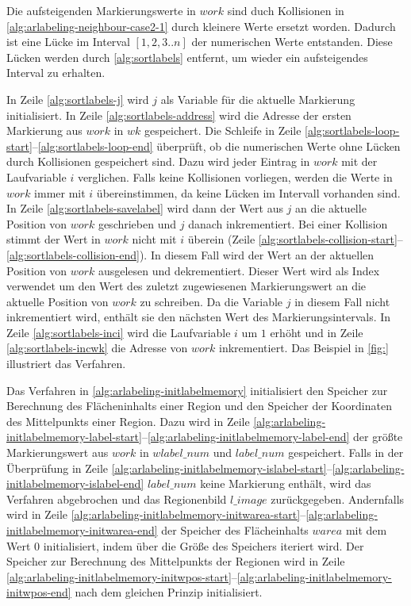 Die aufsteigenden Markierungswerte in $\mathit{work}$ sind duch Kollisionen in
 \autoref{alg:arlabeling-neighbour-case2-1} durch kleinere Werte ersetzt worden. Dadurch ist eine Lücke im Interval
 $\left[1,2,3..n\right]$ der numerischen Werte entstanden. Diese Lücken werden durch \autoref{alg:sortlabels}
 entfernt, um wieder ein aufsteigendes Interval zu erhalten.



In Zeile \ref{alg:sortlabels-j} wird $j$ als Variable für die aktuelle Markierung initialisiert. In Zeile
 \ref{alg:sortlabels-address} wird die Adresse der ersten Markierung aus $\mathit{work}$ in $\mathit{wk}$ gespeichert.
 Die Schleife in Zeile \ref{alg:sortlabels-loop-start}--\ref{alg:sortlabels-loop-end} überprüft, ob die numerischen
 Werte ohne Lücken durch Kollisionen gespeichert sind. Dazu wird jeder Eintrag in $\mathit{work}$ mit der Laufvariable
 $i$ verglichen. Falls keine Kollisionen vorliegen, werden die Werte in $\mathit{work}$ immer mit $i$ übereinstimmen,
 da keine Lücken im Intervall vorhanden sind. In Zeile \ref{alg:sortlabels-savelabel} wird dann der Wert aus $j$ an die
 aktuelle Position von $\mathit{work}$ geschrieben und $j$ danach inkrementiert. Bei einer Kollision stimmt der Wert in
 $\mathit{work}$ nicht mit $i$ überein
 (Zeile \ref{alg:sortlabels-collision-start}--\ref{alg:sortlabels-collision-end}). In diesem Fall wird der Wert an der
 aktuellen Position von $\mathit{work}$ ausgelesen und dekrementiert. Dieser Wert wird als Index verwendet um den Wert
 des zuletzt zugewiesenen Markierungswert an die aktuelle Position von $\mathit{work}$ zu schreiben. Da die Variable
 $j$ in diesem Fall nicht inkrementiert wird, enthält sie den nächsten Wert des Markierungsintervals. In Zeile
 \ref{alg:sortlabels-inci} wird die Laufvariable $i$ um $1$ erhöht und in Zeile \ref{alg:sortlabels-incwk} die Adresse
 von $\mathit{work}$ inkrementiert. Das Beispiel in \autoref{fig:} illustriert das Verfahren.

Das Verfahren in \autoref{alg:arlabeling-initlabelmemory} initialisiert den Speicher zur Berechnung des Flächeninhalts
 einer Region und den Speicher der Koordinaten des Mittelpunkts einer Region. Dazu wird in Zeile
 \ref{alg:arlabeling-initlabelmemory-label-start}--\ref{alg:arlabeling-initlabelmemory-label-end} der größte
 Markierungswert aus $\mathit{work}$ in $\mathit{wlabel\_num}$ und $\mathit{label\_num}$ gespeichert. Falls in der
 Überprüfung in Zeile
 \ref{alg:arlabeling-initlabelmemory-islabel-start}--\ref{alg:arlabeling-initlabelmemory-islabel-end}
 $\mathit{label\_num}$ keine Markierung enthält, wird das Verfahren abgebrochen und das Regionenbild $\mathit{l\_image}$
 zurückgegeben. Andernfalls wird in Zeile
 \ref{alg:arlabeling-initlabelmemory-initwarea-start}--\ref{alg:arlabeling-initlabelmemory-initwarea-end} der Speicher
 des Flächeinhalts $\mathit{warea}$ mit dem Wert $0$ initialisiert, indem über die Größe des Speichers iteriert wird.
 Der Speicher zur Berechnung des Mittelpunkts der Regionen wird in Zeile
 \ref{alg:arlabeling-initlabelmemory-initwpos-start}--\ref{alg:arlabeling-initlabelmemory-initwpos-end} nach dem
 gleichen Prinzip initialisiert.

